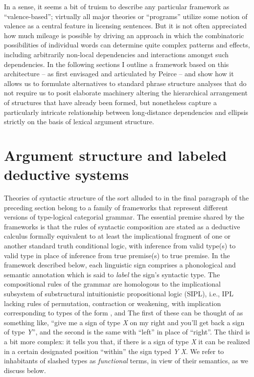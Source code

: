 \documentclass[output=paper,colorlinks,citecolor=brown]{langscibook}
\begin{document}
In a sense, it seems a bit of truism to describe any particular
framework as ``valence-based''; virtually all major theories or
``programs'' utilize some notion of valence as a central feature in
licensing sentences. But it is not often appreciated how much mileage
is possible by driving an approach in which the combinatoric
possibilities of individual words can determine quite complex
patterns and effects, including arbitrarily non-local dependencies and
interactions amongst such dependencies. In the following sections I
outline a framework based on this architecture -- as first envisaged
and articulated by Peirce -- and show how it allows us to formulate
alternatives to standard phrase structure analyses that do not require
us to posit elaborate machinery altering the hierarchical arrangement
of structures that have already been formed, but nonetheless capture a
particularly intricate relationship between long-distance dependencies
and ellipsis strictly on the basis of lexical argument structure.



\section{Argument structure and labeled deductive systems\label{sec:argstruc}}

Theories of syntactic structure of the sort alluded to in the final
paragraph of the preceding section belong to a family of frameworks
that represent different versions of type-logical categorial grammar.
The essential premise shared by the frameworks is that the rules of
syntactic composition are stated as a deductive calculus formally
equivalent to at least the implicational fragment of one or another
standard truth conditional logic, with inference from valid type(s) to
valid type in place of inference from true premise(s) to true
premise. In the framework described below, each linguistic sign
comprises a phonological and semantic annotation which is said to
\textsl{label} the sign's syntactic type. The compositional rules of
the grammar are homologous to the implicational subsystem of
substructural intuitionistic propositional logic (SIPL), i.e.,
IPL lacking rules of permutation, contraction or weakening, with implication
corresponding to types of the form ,  and  The
first of these can be thought of as something like, ``give me a sign of
type \textit{X} on my right and you'll get back a sign of type  \textit{Y}'', and the
second is the same with ``left'' in place of ``right''. The third is a bit
more complex: it tells you that, if there is a sign of type \textit{X} it can be
realized in a certain designated position ``within'' the sign typed
\textit{Y} \vs \textit{X}. We refer to inhabitants of slashed types as
\textsl{functional} terms, in view of their semantics, as we discuss below.
\end{document}
